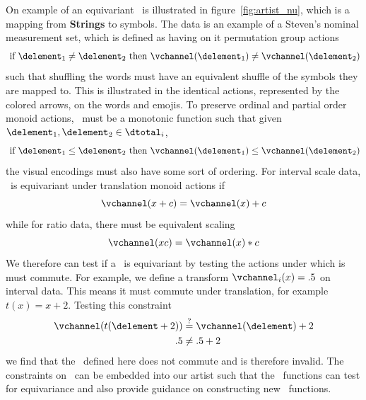\documentclass[../main.tex]{subfiles}
\begin{document}
On example of an equivariant \vchannel\ is illustrated in figure~\ref{fig:artist_nu}, which is a mapping from \textbf{Strings} to symbols. The data is an example of a Steven's nominal measurement set, which is defined as having on it permutation group actions 
\begin{equation}
    \text{ if } \delement_1 \neq \delement_2 \text{ then } \vchannel (\delement_1) \neq\vchannel(\delement_2)
\end{equation}
such that shuffling the words must have an equivalent shuffle of the symbols they are mapped to. This is illustrated in the identical actions, represented by the colored arrows, on the words and emojis. To preserve ordinal and partial order monoid actions, \vchannel\ must be a monotonic function such that given $\delement_1, \delement_2 \in \dtotal_{i}$,
\begin{equation}
\text{ if } \delement_1 \leq \delement_2 \text{ then } \vchannel (\delement_1) \leq \vchannel(\delement_2)
\end{equation}
the visual encodings must also have some sort of ordering. For interval scale data, \vchannel\ is equivariant under translation monoid actions if 
\begin{equation}
\vchannel (x + c) = \vchannel(x) + c
\end{equation}
while for ratio data, there must be equivalent scaling 
\begin{equation}
\vchannel(xc) = \vchannel(x)*c 
\end{equation}
We therefore can test if a \vchannel\ is equivariant by testing the actions under which is must  commute. For example, we define a transform $\vchannel_{i}(x) = .5$ on interval data. This means it must commute under translation, for example $t(x) = x+2$. Testing this constraint 
\begin{align}
    \vchannel(t(\delement + 2)) & \overset{?}{=} \vchannel(\delement) + 2\\
    .5 &\neq .5 + 2
\end{align}
we find that the \vchannel\ defined here does not commute and is therefore invalid. The constraints on \vchannel\ can be embedded into our artist such that the \vchannel\ functions can test for equivariance and also provide guidance on constructing new \vchannel\ functions. 
\end{document}
